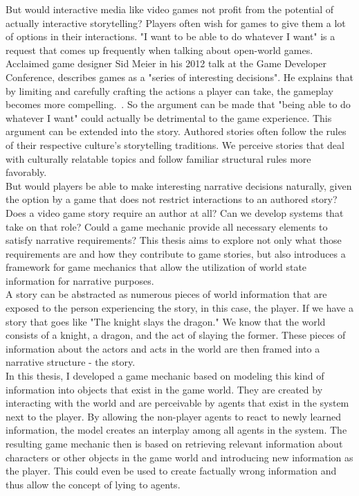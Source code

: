 But would interactive media like video games not profit from the potential of actually interactive storytelling? Players often wish for games to give them a lot of options in their interactions. "I want to be able to do whatever I want" is a request that comes up frequently when talking about open-world games. Acclaimed game designer Sid Meier in his 2012 talk at the Game Developer Conference, describes games as a "series of interesting decisions". He explains that by limiting and carefully crafting the actions a player can take, the gameplay becomes more compelling.~\cite{Dring2018}. So the argument can be made that "being able to do whatever I want" could actually be detrimental to the game experience. This argument can be extended into the story. Authored stories often follow the rules of their respective culture's storytelling traditions. We perceive stories that deal with culturally relatable topics and follow familiar structural rules more favorably.~\cite{Cooney2017}\\
But would players be able to make interesting narrative decisions naturally, given the option by a game that does not restrict interactions to an authored story? Does a video game story require an author at all? Can we  develop systems that take on that role? Could a game mechanic provide all necessary elements to satisfy narrative requirements? This thesis aims to explore not only what those requirements are and how they contribute to game stories, but also introduces a framework for game mechanics that allow the utilization of world state information for narrative purposes.\\
A story can be abstracted as numerous pieces of world information that are exposed to the person experiencing the story, in this case, the player. If we have a story that goes like "The knight slays the dragon." We know that the world consists of a knight, a dragon, and the act of slaying the former. These pieces of information about the actors and acts in the world are then framed into a narrative structure - the story.\\
In this thesis, I developed a game mechanic based on modeling this kind of information into objects that exist in the game world. They are created by interacting with the world and are perceivable by agents that exist in the system next to the player. By allowing the non-player agents to react to newly learned information, the model creates an interplay among all agents in the system. The resulting game mechanic then is based on retrieving relevant information about characters or other objects in the game world and introducing new information as the player. This could even be used to create factually wrong information and thus allow the concept of lying to agents.\\
